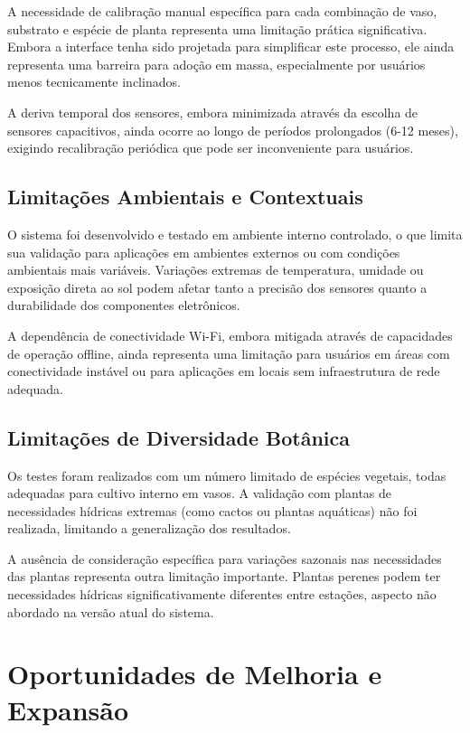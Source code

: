 A necessidade de calibração manual específica para cada combinação de vaso, substrato e espécie de planta representa uma limitação prática significativa. Embora a interface tenha sido projetada para simplificar este processo, ele ainda representa uma barreira para adoção em massa, especialmente por usuários menos tecnicamente inclinados.

A deriva temporal dos sensores, embora minimizada através da escolha de sensores capacitivos, ainda ocorre ao longo de períodos prolongados (6-12 meses), exigindo recalibração periódica que pode ser inconveniente para usuários.

\subsection{Limitações Ambientais e Contextuais}

O sistema foi desenvolvido e testado em ambiente interno controlado, o que limita sua validação para aplicações em ambientes externos ou com condições ambientais mais variáveis. Variações extremas de temperatura, umidade ou exposição direta ao sol podem afetar tanto a precisão dos sensores quanto a durabilidade dos componentes eletrônicos.

A dependência de conectividade Wi-Fi, embora mitigada através de capacidades de operação offline, ainda representa uma limitação para usuários em áreas com conectividade instável ou para aplicações em locais sem infraestrutura de rede adequada.

\subsection{Limitações de Diversidade Botânica}

Os testes foram realizados com um número limitado de espécies vegetais, todas adequadas para cultivo interno em vasos. A validação com plantas de necessidades hídricas extremas (como cactos ou plantas aquáticas) não foi realizada, limitando a generalização dos resultados.

A ausência de consideração específica para variações sazonais nas necessidades das plantas representa outra limitação importante. Plantas perenes podem ter necessidades hídricas significativamente diferentes entre estações, aspecto não abordado na versão atual do sistema.

\section{Oportunidades de Melhoria e Expansão}

